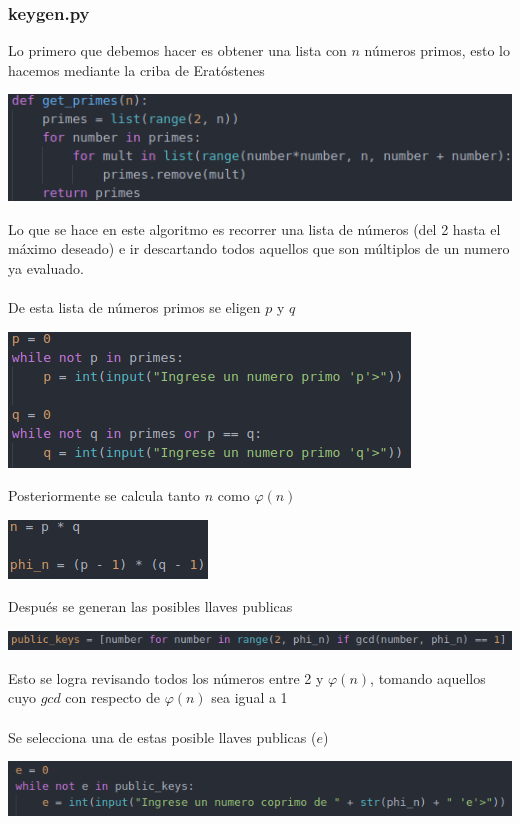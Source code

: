 \documentclass{article}
\begin{document}
  \subsubsection{keygen.py}
  Lo primero que debemos hacer es obtener una lista con $n$ números primos, esto lo hacemos mediante la criba de Eratóstenes\\
  \begin{center}
    \includegraphics{img/get_primes.png}
  \end{center}
  Lo que se hace en este algoritmo es recorrer una lista de números (del 2 hasta el máximo deseado) e ir descartando todos aquellos que son múltiplos de un numero ya evaluado.\\
  \\
  De esta lista de números primos se eligen $p$ y $q$\\
  \begin{center}
    \includegraphics{img/get_p_q.png}
  \end{center}

  Posteriormente se calcula tanto $n$ como $\varphi(n)$\\
  \begin{center}
    \includegraphics{img/calculate_n_phin.png}
  \end{center}

  Después se generan las posibles llaves publicas
  \begin{center}
    \includegraphics{img/public_keys.png}
  \end{center}
  Esto se logra revisando todos los números entre 2 y $\varphi(n)$, tomando aquellos cuyo $gcd$ con respecto de $\varphi(n)$ sea igual a 1\\
  \\
  Se selecciona una de estas posible llaves publicas ($e$)
  \begin{center}
    \includegraphics{img/get_e.png}
  \end{center}
\end{document}
